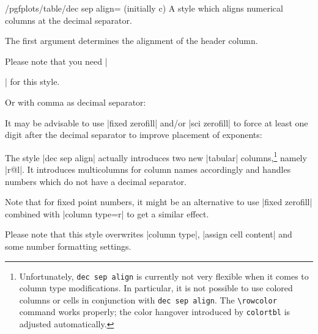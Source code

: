 \documentclass[a4paper]{ltxdoc}
\begin{document}
\begin{stylekey}{/pgfplots/table/dec sep align= (initially c)}
    A style which aligns numerical columns at the decimal separator.

    The first argument determines the alignment of the header column.

    Please note that you need |\usepackage{array}| for this style.
\begin{codeexample}[]
\end{codeexample}

    Or with comma as decimal separator:
\begin{codeexample}[]
\end{codeexample}
    It may be advisable to use |fixed zerofill| and/or |sci zerofill| to force
    at least one digit after the decimal separator to improve placement of
    exponents:
\begin{codeexample}[]
\end{codeexample}

    The style |dec sep align| actually introduces two new |tabular|
    columns,\footnote{Unfortunately, \texttt{dec sep align} is currently not
    very flexible when it comes to column type modifications. In particular, it
    is not possible to use colored columns or cells in conjunction with
    \texttt{dec sep align}. The \texttt{\textbackslash rowcolor} command works
    properly; the color hangover introduced by \texttt{colortbl} is adjusted
    automatically.} namely |r@{}l|. It introduces multicolumns for column
    names accordingly and handles numbers which do not have a decimal
    separator.

    Note that for fixed point numbers, it might be an alternative to use
    |fixed zerofill| combined with |column type=r| to get a similar effect.

    Please note that this style overwrites |column type|, |assign cell content|
    and some number formatting settings.
\end{stylekey}
\end{document}
